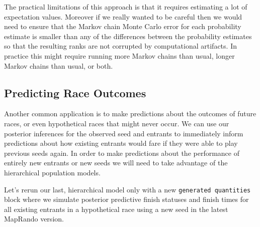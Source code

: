 \documentclass[
  letterpaper,
  DIV=11,
  numbers=noendperiod]{scrartcl}
\begin{document}
The practical limitations of this approach is that it requires
estimating a lot of expectation values. Moreover if we really wanted to
be careful then we would need to ensure that the Markov chain Monte
Carlo error for each probability estimate is smaller than any of the
differences between the probability estimates so that the resulting
ranks are not corrupted by computational artifacts. In practice this
might require running more Markov chains than usual, longer Markov
chains than usual, or both.

\subsection{Predicting Race Outcomes}\label{predicting-race-outcomes}

Another common application is to make predictions about the outcomes of
future races, or even hypothetical races that might never occur. We can
use our posterior inferences for the observed seed and entrants to
immediately inform predictions about how existing entrants would fare if
they were able to play previous seeds again. In order to make
predictions about the performance of entirely new entrants or new seeds
we will need to take advantage of the hierarchical population models.

Let's rerun our last, hierarchical model only with a new
\texttt{generated\ quantities} block where we simulate posterior
predictive finish statuses and finish times for all existing entrants in
a hypothetical race using a new seed in the latest MapRando version.
\end{document}
